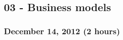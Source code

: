 \documentclass[a4paper]{article}
\begin{document}


    



\subsection{03 - Business models}

\subsubsection{December 14, 2012 (2 hours)}
\end{document}
